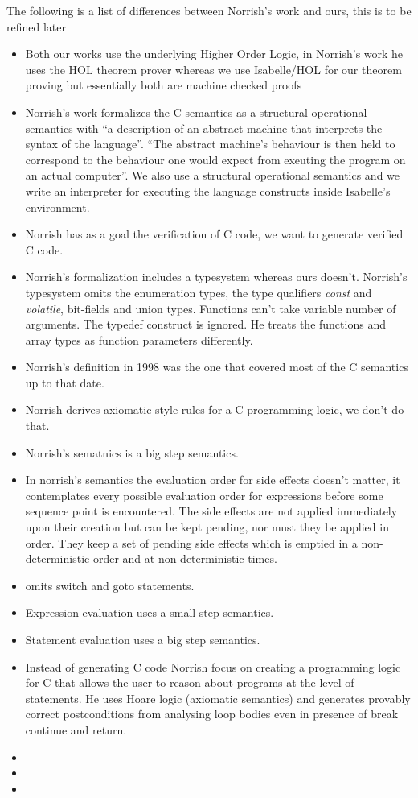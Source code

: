The following is a list of differences between Norrish's work and ours, this is to be refined later
\begin{itemize}
\item{Both our works use the underlying Higher Order Logic, in Norrish's work he uses the HOL theorem prover whereas we use Isabelle/HOL for our theorem proving but essentially both are machine checked proofs}
\item{Norrish's work formalizes the C semantics as a structural operational semantics with ``a description of an abstract machine that interprets the syntax of the language''.
``The abstract machine's behaviour is then held to correspond to the behaviour one would expect from exeuting the program on an actual computer''.
We also use a structural operational semantics and we write an interpreter for executing the language constructs inside Isabelle's environment.}
\item{Norrish has as a goal the verification of C code, we want to generate verified C code.}
\item{Norrish's formalization includes a typesystem whereas ours doesn't.
Norrish's typesystem omits the enumeration types, the type qualifiers \textit{const} and \textit{volatile}, bit-fields and union types.
Functions can't take variable number of arguments.
The typedef construct is ignored.
He treats the functions and array types as function parameters differently.}
\item{Norrish's definition in 1998 was the one that covered most of the C semantics up to that date.}
\item{Norrish derives axiomatic style rules for a C programming logic, we don't do that.}
\item{Norrish's sematnics is a big step semantics.}
\item{In norrish's semantics the evaluation order for side effects doesn't matter, it contemplates every possible evaluation order for expressions before some sequence point is encountered.
The side effects are not applied immediately upon their creation but can be kept pending, nor must they be applied in order.
They keep a set of pending side effects which is emptied in a non-deterministic order and at non-deterministic times.}
\item{omits switch and goto statements.}
\item{Expression evaluation uses a small step semantics.}
\item{Statement evaluation uses a big step semantics.}
\item{Instead of generating C code Norrish focus on creating a programming logic for C that allows the user to reason about programs at the level of statements.
He uses Hoare logic (axiomatic semantics) and generates provably correct postconditions from analysing loop bodies even in presence of break continue and return.}
\item{}
\item{}
\item{}
\end{itemize}


